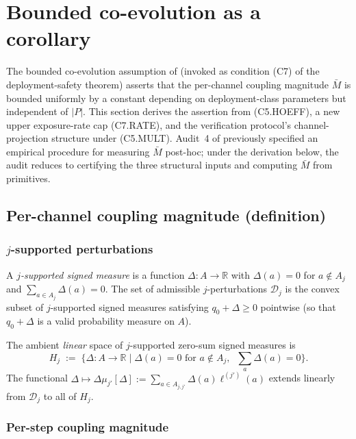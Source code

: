 \section{Bounded co-evolution as a corollary}
\label{sec:bounded_coev}

The bounded co-evolution assumption of
\citep[Condition~(C7)]{lasser2026paper10} (invoked as condition (C7)
of the deployment-safety theorem) asserts that the per-channel
coupling magnitude $\bar{M}$ is bounded uniformly by a constant
depending on deployment-class parameters but independent of $|P|$.
This section derives the assertion from (C5.HOEFF), a new upper
exposure-rate cap (C7.RATE), and the verification protocol's
channel-projection structure under (C5.MULT).
Audit~4 of \citep[\S 8]{lasser2026paper10} previously specified an
empirical procedure for measuring $\bar{M}$ post-hoc; under the
derivation below, the audit reduces to certifying the three
structural inputs and computing $\bar{M}$ from primitives.

\subsection{Per-channel coupling magnitude (definition)}

\subsubsection{$j$-supported perturbations}

A \emph{$j$-supported signed measure} is a function
$\Delta: A \to \mathbb{R}$ with $\Delta(a) = 0$ for $a \notin A_j$
and $\sum_{a \in A_j} \Delta(a) = 0$. The set of admissible
$j$-perturbations
$\mathcal{D}_j$ is the convex subset of $j$-supported signed
measures satisfying $q_0 + \Delta \geq 0$ pointwise (so that
$q_0 + \Delta$ is a valid probability measure on $A$).

The ambient \emph{linear} space of $j$-supported zero-sum signed
measures is
\begin{equation}
\label{eq:Hj-def-companion}
  H_j \;:=\; \{\Delta : A \to \mathbb{R} \mid \Delta(a) = 0
  \text{ for } a \notin A_j, \;\; \textstyle\sum_a \Delta(a) =
  0\}.
\end{equation}
The functional $\Delta \mapsto \Delta\mu_{j'}[\Delta] := \sum_{a
\in A_{j,j'}} \Delta(a) \ell^{(j')}(a)$ extends linearly from
$\mathcal{D}_j$ to all of $H_j$.

\subsubsection{Per-step coupling magnitude}

